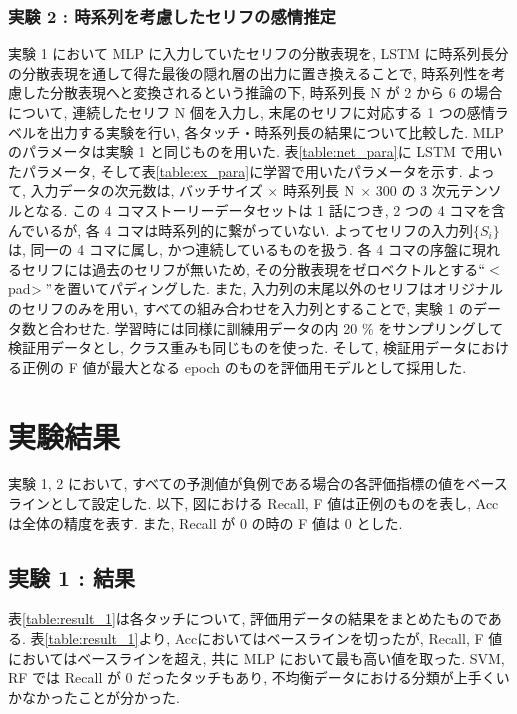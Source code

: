 \documentclass[twocolumn]{jarticle}     %
\begin{document}
\subsubsection{\small{実験 2 : 時系列を考慮したセリフの感情推定}}
実験 1 において MLP に入力していたセリフの分散表現を, LSTM に時系列長分の分散表現を通して得た最後の隠れ層の出力に置き換えることで,
時系列性を考慮した分散表現へと変換されるという推論の下, 時系列長 N が 2 から 6 の場合について, 連続したセリフ N 個を入力し, 末尾のセリフに対応する 1 つの感情ラベルを出力する実験を行い, 各タッチ・時系列長の結果について比較した. MLP のパラメータは実験 1 と同じものを用いた. 表\ref{table:net_para}に LSTM で用いたパラメータ, そして表\ref{table:ex_para}に学習で用いたパラメータを示す. よって, 入力データの次元数は, バッチサイズ $\times$ 時系列長 $\rm N$ $\times$ 300 の 3 次元テンソルとなる. この 4 コマストーリーデータセットは 1 話につき, 2 つの 4 コマを含んでいるが, 各 4 コマは時系列的に繋がっていない. よってセリフの入力列$\{S_i\}$は, 同一の 4 コマに属し, かつ連続しているものを扱う. 各 4 コマの序盤に現れるセリフには過去のセリフが無いため, その分散表現をゼロベクトルとする$``<$pad$>"$を置いてパディングした. また, 入力列の末尾以外のセリフはオリジナルのセリフのみを用い, すべての組み合わせを入力列とすることで, 実験 1 のデータ数と合わせた. 学習時には同様に訓練用データの内 20 \% をサンプリングして検証用データとし, クラス重みも同じものを使った. そして, 検証用データにおける正例の F 値が最大となる epoch のものを評価用モデルとして採用した.



\section{実験結果}
実験 1, 2 において, すべての予測値が負例である場合の各評価指標の値をベースラインとして設定した. 以下, 図における Recall, F 値は正例のものを表し, Acc は全体の精度を表す. また, Recall が 0 の時の F 値は 0 とした.

\subsection{実験 1 : 結果}
表\ref{table:result_1}は各タッチについて, 評価用データの結果をまとめたものである.
表\ref{table:result_1}より, Accにおいてはベースラインを切ったが, Recall, F 値においてはベースラインを超え, 共に MLP において最も高い値を取った. SVM, RF では Recall が 0 だったタッチもあり, 不均衡データにおける分類が上手くいかなかったことが分かった.
\end{document}

